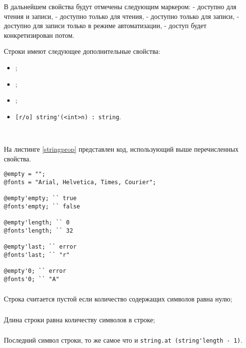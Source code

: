 \documentclass[a4paper, 14pt]{extarticle}
\newenvironment{icItems}
	{ \begin{itemize} [noitemsep,nolistsep] }
	{ \end{itemize} }
\begin{document}
В дальнейшем свойства будут отмечены следующим маркером: \code{[r/w]} - доступно для чтения и записи, \code{[r/o]} - доступно только для чтения, \code{[w/o]} - доступно только для записи,  \code{[r/*]} - доступно для записи только в режиме автоматизации, \code{[*/*]} - доступ будет конкретизирован потом.

Строки имеют следующее дополнительные свойства:
\begin{icItems}
\item
	;
\item
	;
\item
	;
\item
	\lstinline|[r/o] string'(<int>n) : string|.
\end{icItems}

\

На листинге \ref{stringprop} представлен код, использующий выше перечисленных свойства.

\begin{lstlisting}[caption=Свойства класса string, label=stringprop]
@empty = "";
@fonts = "Arial, Helvetica, Times, Courier";

@empty'empty; `` true
@fonts'empty; `` false

@empty'length; `` 0
@fonts'length; `` 32

@empty'last; `` error
@fonts'last; `` "r"

@empty'0; `` error
@fonts'0; `` "A"
\end{lstlisting}

\subsubsection{}

Строка считается пустой если количество содержащих символов равна нулю;

\subsubsection{}

Длина строки равна количеству символов в строке;

\subsubsection{}

Последний символ строки, то же самое что и \lstinline|string.at (string'length - 1)|.
\end{document}
